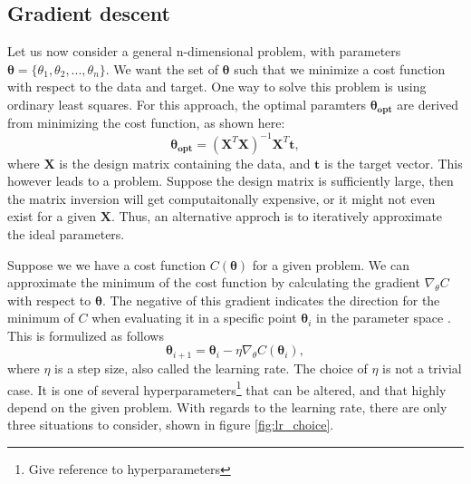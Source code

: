 \subsection*{Gradient descent}
Let us now consider a general n-dimensional problem, with parameters $\boldsymbol{\theta} = \{\theta_1, \theta_2, ..., \theta_n\}$. We want the set of $\boldsymbol{\theta}$
such that we minimize a cost function with respect to the data and target. One way to solve this problem is using ordinary least squares. For this approach, 
the optimal paramters $\boldsymbol{\theta_{opt}}$ are derived from minimizing the cost function, as shown here:
\begin{equation*}
    \boldsymbol{\theta_{opt}} = (\boldsymbol{X}^T\boldsymbol{X})^{-1}\boldsymbol{X}^T\boldsymbol{t},
\end{equation*}
where $\boldsymbol{X}$ is the design matrix containing the data, and $\boldsymbol{t}$ is the target vector. This however leads to a problem. Suppose the design matrix is sufficiently large,
then the matrix inversion will get computaitonally expensive, or it might not even exist for a given $\boldsymbol{X}$. Thus, an alternative approch is to iteratively approximate the ideal 
parameters. \par 
Suppose we we have a cost function $C(\boldsymbol{\theta})$ for a given problem. We can approximate the minimum of the cost function by calculating
the gradient $\nabla_{\theta}C$ with respect to $\boldsymbol{\theta}$. The negative of this gradient indicates the direction for the minimum of $C$ when evaluating 
it in a specific point $\boldsymbol{\theta}_i$ in the parameter space \cite{FYSSTK}. This is formulized as follows 
\begin{equation}
    \boldsymbol{\theta}_{i+1} = \boldsymbol{\theta}_i - \eta\nabla_{\theta}C(\boldsymbol{\theta}_i),
\end{equation}
where $\eta$ is a step size, also called the learning rate. The choice of $\eta$ is not a trivial case. It is one of several 
hyperparameters\footnote{Give reference to hyperparameters}
that can be altered, and that highly depend on the given problem. With regards to the learning rate, there are only three situations to consider, shown in figure \ref{fig:lr_choice}.

